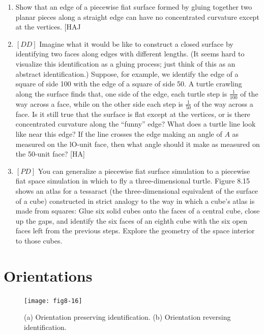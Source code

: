 \documentclass{book}
\begin{document}
\begin{enumerate}
\item Show that an edge of a piecewise fiat surface formed by gluing
together two planar pieces along a straight edge can have no concentrated
curvature except at the vertices. [HAJ

\item $[DD]$ Imagine what it would be like to construct a closed surface by
identifying two faces along edges with different lengths. (It seems hard
to visualize this identification as a gluing process; just think of this as an
abstract identification.) Suppose, for example, we identify the edge of a
square of side 100 with the edge of a square of side 50. A turtle crawling
along the surface finds that, one side of the edge, each turtle step is
$\frac {1} {100}$ of the way across a face, while on the other side each step is $\frac {1} {50}$ of
the way across a face. Is it still true that the surface is flat except at
the vertices, or is there concentrated curvature along the ``funny'' edge?
What does a turtle line look like near this edge? If the line crosses the
edge making an angle of $A$ as measured on the lO-unit face, then what
angle should it make as measured on the 50-unit face? [HA]

\item $[PD]$ You can generalize a piecewise fiat surface simulation to a
piecewise fiat space simulation in which to fly a three-dimensional turtle.
Figure 8.15 shows an atlas for a tessaract (the three-dimensional equivalent of the surface of a cube) constructed in strict analogy to the way
in which a cube's atlas is made from squares: Glue six solid cubes onto
the faces of a central cube, close up the gaps, and identify the six faces
of an eighth cube with the six open faces left from the previous steps.
Explore the geometry of the space interior to those cubes.

\end{enumerate}

\section{Orientations}

\begin{figure}
\begin{center}
\texttt{[image: fig8-16]}
\caption{(a) Orientation preserving identification. (b) Orientation reversing identification.}
\end{center}
\end{figure}
\end{document}
